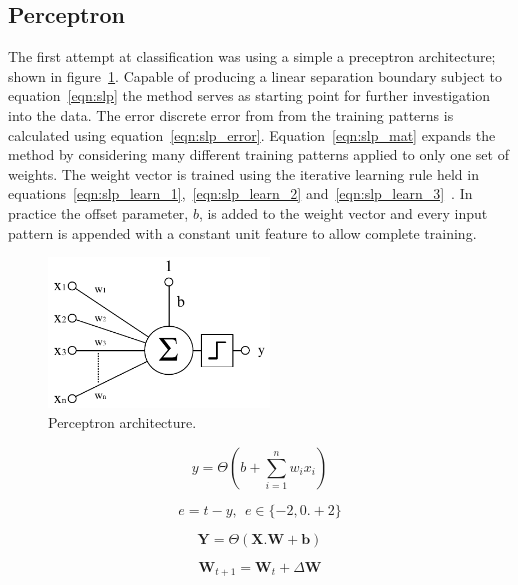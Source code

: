 \documentclass{ecsarticle}     %
\begin{document}
\subsection{Perceptron}


The first attempt at classification was using a simple a preceptron architecture; shown in figure~\ref{fig:slp}.
Capable of producing a linear separation boundary subject to equation~\eqref{eqn:slp} the method serves as starting point for further investigation into the data.
The error discrete error from from the training patterns is calculated using equation~\eqref{eqn:slp_error}.
Equation~\eqref{eqn:slp_mat} expands the method by considering many different training patterns applied to only one set of weights.
The weight vector is trained using the iterative learning rule held in equations~\eqref{eqn:slp_learn_1},~\eqref{eqn:slp_learn_2} and~\eqref{eqn:slp_learn_3}~\citep{info05mackay}.
In practice the offset parameter, $b$, is added to the weight vector and every input pattern is appended with a constant unit feature to allow complete training.

\begin{figure}[ht]
   \centering
    \includegraphics[height = 4cm]{SLP.pdf}
   \caption{Perceptron architecture.}
   \label{fig:slp}
\end{figure}

\begin{equation}
   y = \Theta \left(b + \sum_{i=1}^{n} w_i x_i \right)
   \label{eqn:slp}
\end{equation}

\begin{equation}	
	e = t - y,\:\:e \in \{-2,0.+2\}
	\label{eqn:slp_error}
\end{equation}

\begin{equation}
   \textbf{Y} = \Theta ( \textbf{X}.\textbf{W} + \textbf{b})
   \label{eqn:slp_mat}
\end{equation}

\begin{equation}	
	\textbf{W}_{t+1} = \textbf{W}_t + \Delta \textbf{W}
	\label{eqn:slp_learn_1}
\end{equation}
\end{document}
